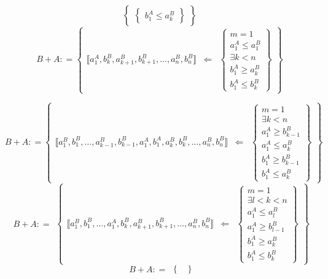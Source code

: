 \begin{enumerate}
\[\begin{Bmatrix}
\begin{Bmatrix}
  {b_{1}^{A} \leq a_{k}^{B}}
  \end{Bmatrix}
  \end{Bmatrix}\]\[{{B + A}{: =}}\begin{Bmatrix}
  {⟦{{a_{1}^{A},b_{k}^{B}},{a_{k + 1}^{B},b_{k + 1}^{B}},\ldots,{a_{n}^{B},b_{n}^{B}}}⟧} & \Leftarrow & \begin{Bmatrix}
  {m = 1} \\
  {a_{1}^{A} \leq a_{1}^{B}} \\
  {\exists{k < n}} \\
  {b_{1}^{A} \geq a_{k}^{B}} \\
  {b_{1}^{A} \leq b_{k}^{B}}
  \end{Bmatrix}
  \end{Bmatrix}\]

  \[{{B + A}{: =}}\begin{Bmatrix}
  {⟦{{a_{1}^{B},b_{1}^{B}},\ldots,{a_{k - 1}^{B},b_{k - 1}^{B}},{a_{1}^{A},b_{1}^{A}},{a_{k}^{B},b_{k}^{B}},\ldots,{a_{n}^{B},b_{n}^{B}}}⟧} & \Leftarrow & \begin{Bmatrix}
  {m = 1} \\
  {\exists{k < n}} \\
  {a_{1}^{A} \geq b_{k - 1}^{B}} \\
  {a_{1}^{A} \leq a_{k}^{B}} \\
  {b_{1}^{A} \geq b_{k - 1}^{B}} \\
  {b_{1}^{A} \leq a_{k}^{B}}
  \end{Bmatrix}
  \end{Bmatrix}\]\[\begin{matrix}
  {{B + A}{: =}}
  \end{matrix}\begin{Bmatrix}
  {⟦{{a_{1}^{B},b_{1}^{B}},\ldots,{a_{1}^{A},b_{k}^{B}},{a_{k + 1}^{B},b_{k + 1}^{B}},\ldots,{a_{n}^{B},b_{n}^{B}}}⟧} & \Leftarrow & \begin{Bmatrix}
  {m = 1} \\
  {\exists{{l < k} < n}} \\
  {a_{1}^{A} \leq a_{l}^{B}} \\
  {a_{1}^{A} \geq b_{l - 1}^{B}} \\
  {b_{1}^{A} \geq a_{k}^{B}} \\
  {b_{1}^{A} \leq b_{k}^{B}}
  \end{Bmatrix}
  \end{Bmatrix}\]\[\begin{matrix}
  {{B + A}{: =}}
  \end{matrix}\begin{Bmatrix}

\end{Bmatrix}\]
\end{enumerate}
